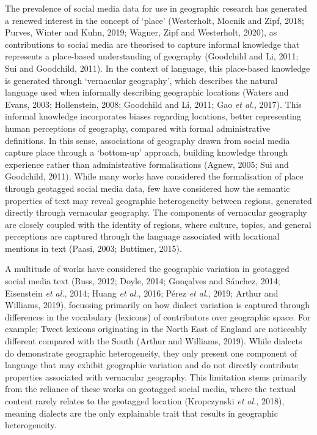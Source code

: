 \documentclass[
]{article}
\begin{document}
The prevalence of social media data for use in geographic research has
generated a renewed interest in the concept of `place' (Westerholt,
Mocnik and Zipf, 2018; Purves, Winter and Kuhn, 2019; Wagner, Zipf and
Westerholt, 2020), as contributions to social media are theorised to
capture informal knowledge that represents a place-based understanding
of geography (Goodchild and Li, 2011; Sui and Goodchild, 2011). In the
context of language, this place-based knowledge is generated through
`vernacular geography', which describes the natural language used when
informally describing geographic locations (Waters and Evans, 2003;
Hollenstein, 2008; Goodchild and Li, 2011; Gao \emph{et al.}, 2017).
This informal knowledge incorporates biases regarding locations, better
representing human perceptions of geography, compared with formal
administrative definitions. In this sense, associations of geography
drawn from social media capture place through a `bottom-up' approach,
building knowledge through experience rather than administrative
formalisations (Agnew, 2005; Sui and Goodchild, 2011). While many works
have considered the formalisation of place through geotagged social
media data, few have considered how the semantic properties of text may
reveal geographic heterogeneity between regions, generated directly
through vernacular geography. The components of vernacular geography are
closely coupled with the identity of regions, where culture, topics, and
general perceptions are captured through the language associated with
locational mentions in text (Paasi, 2003; Buttimer, 2015).

A multitude of works have considered the geographic variation in
geotagged social media text (Russ, 2012; Doyle, 2014; Gonçalves and
Sánchez, 2014; Eisenstein \emph{et al.}, 2014; Huang \emph{et al.},
2016; Pérez \emph{et al.}, 2019; Arthur and Williams, 2019), focussing
primarily on how dialect variation is captured through differences in
the vocabulary (lexicons) of contributors over geographic space. For
example; Tweet lexicons originating in the North East of England are
noticeably different compared with the South (Arthur and Williams,
2019). While dialects do demonstrate geographic heterogeneity, they only
present one component of language that may exhibit geographic variation
and do not directly contribute properties associated with vernacular
geography. This limitation stems primarily from the reliance of these
works on geotagged social media, where the textual content rarely
relates to the geotagged location (Kropczynski \emph{et al.}, 2018),
meaning dialects are the only explainable trait that results in
geographic heterogeneity.
\end{document}
